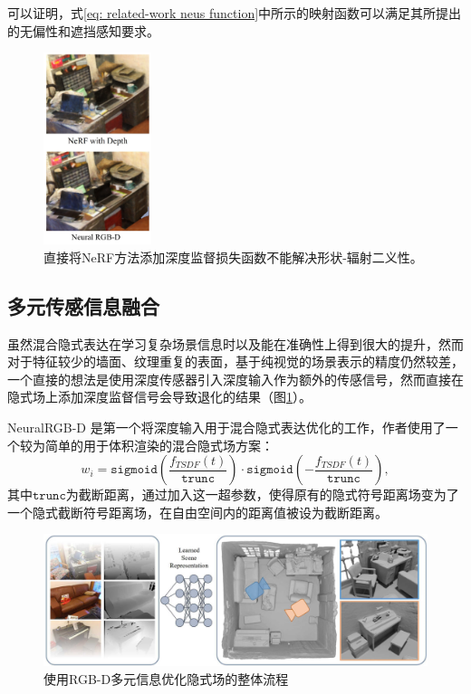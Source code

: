 可以证明，式\ref{eq: related-work neus function}中所示的映射函数可以满足其所提出的无偏性和遮挡感知要求。

\begin{figure}[ht]
    \centering
    \includegraphics[width=0.28\textwidth]{undergraduate-thesis/images/related-work/neural-rgbd comparison with NeRF.png}
    \caption{直接将NeRF方法添加深度监督损失函数不能解决形状-辐射二义性。}
    \label{fig:related-work neural-rgbd comparison with NeRF}
\end{figure}

\subsection{多元传感信息融合}
虽然混合隐式表达在学习复杂场景信息时以及能在准确性上得到很大的提升，然而对于特征较少的墙面、纹理重复的表面，基于纯视觉的场景表示的精度仍然较差，一个直接的想法是使用深度传感器\cite{zabatani_intel_2020}引入深度输入作为额外的传感信号，然而直接在隐式场上添加深度监督信号会导致退化的结果（图\ref{fig:related-work neural-rgbd comparison with NeRF}）。

NeuralRGB-D 是第一个将深度输入用于混合隐式表达优化的工作\cite{azinovic_neural_2022}，作者使用了一个较为简单的用于体积渲染的混合隐式场方案：
\begin{equation}
    w_i = \mathtt{sigmoid}\left(\frac{f_{TSDF}(t)}{\mathtt{trunc}}\right)\cdot\mathtt{sigmoid}\left(-\frac{f_{TSDF}(t)}{\mathtt{trunc}}\right),
\end{equation}
其中$\mathtt{trunc}$为截断距离，通过加入这一超参数，使得原有的隐式符号距离场变为了一个隐式截断符号距离场，在自由空间内的距离值被设为截断距离。

\begin{figure}[htbp]
    \centering
    \includegraphics[width=\textwidth]{undergraduate-thesis/images/related-work/neural-rgbd problem.png}
    \caption{使用RGB-D多元信息优化隐式场的整体流程}
    \label{fig:related-work neural-rgbd formulation}
\end{figure}

